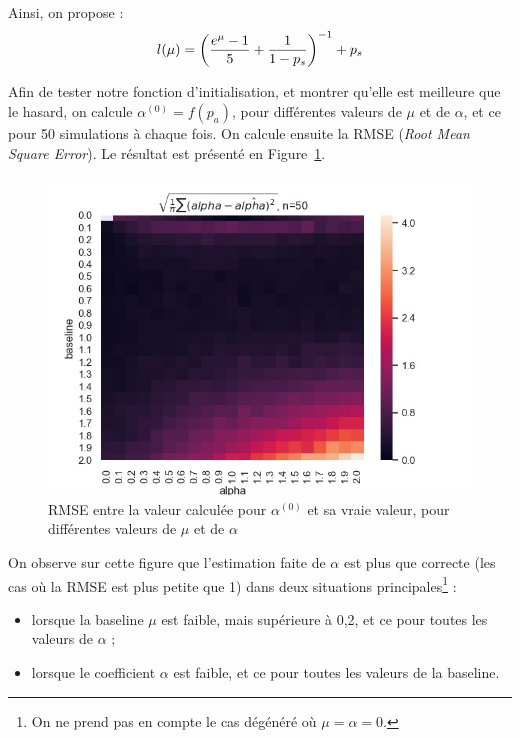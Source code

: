 Ainsi, on propose :
\begin{equation}
    l(\mu) = \left( \frac{e^{\mu}-1}{5} + \frac{1}{1-p_s} \right)^{-1} + p_s
\end{equation}

Afin de tester notre fonction d'initialisation, et montrer qu'elle est meilleure que le hasard, on calcule $\alpha^{(0)} = f(p_a)$, pour différentes valeurs de $\mu$ et de $\alpha$, et ce pour 50 simulations à chaque fois.
On calcule ensuite la RMSE (\textit{Root Mean Square Error}).
Le résultat est présenté en Figure~\ref{fig:heatmap_alpha_init_rmse}.

\begin{figure}[h!]
    \centering
    \includegraphics[scale=0.6]{pics/heatmap_baseline_alpha_alpha_init_rmse.jpg}
    \caption{RMSE entre la valeur calculée pour $\alpha^{(0)}$ et sa vraie valeur, pour différentes valeurs de $\mu$ et de $\alpha$}
    \label{fig:heatmap_alpha_init_rmse}
\end{figure}

On observe sur cette figure que l'estimation faite de $\alpha$ est plus que correcte (\cad les cas où la RMSE est plus petite que 1) dans deux situations principales\footnote{On ne prend pas en compte le cas dégénéré où $\mu = \alpha = 0$.} :
\begin{itemize}
    \item lorsque la baseline $\mu$ est faible, mais supérieure à 0,2, et ce pour toutes les valeurs de $\alpha$ ; 
    \item lorsque le coefficient $\alpha$ est faible, et ce pour toutes les valeurs de la baseline.
\end{itemize}


